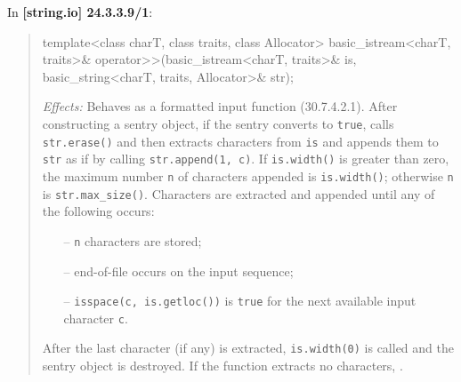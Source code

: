 \documentclass{wg21}
\begin{document}
In \textbf{[string.io] 24.3.3.9/1}:
\begin{quote}
\begin{codeblock}
template<class charT, class traits, class Allocator>
  basic_istream<charT, traits>&
    operator>>(basic_istream<charT, traits>& is, basic_string<charT, traits, Allocator>& str);
\end{codeblock}
\textit{Effects:} Behaves as a formatted input function (30.7.4.2.1). After
constructing a sentry object, if the sentry converts to \texttt{true}, calls
\texttt{str.erase()} and then extracts characters from \texttt{is} and appends
them to \texttt{str} as if by calling \texttt{str.append(1, c)}. If \texttt{is.width()}
is greater than zero, the maximum number \texttt{n} of characters appended is
\texttt{is.width()}; otherwise \texttt{n} is \texttt{str.max_size()}.
Characters are extracted and appended until any of the following occurs:
\begin{itemize}
  \item[--] \texttt{n} characters are stored;
  \item[--] end-of-file occurs on the input sequence;
  \item[--] \texttt{isspace(c, is.getloc())} is \texttt{true} for the next
            available input character \texttt{c}.
\end{itemize}
After the last character (if any) is extracted, \texttt{is.width(0)} is called
and the sentry object is destroyed. If the function extracts no characters,
.
\end{quote}
\end{document}
